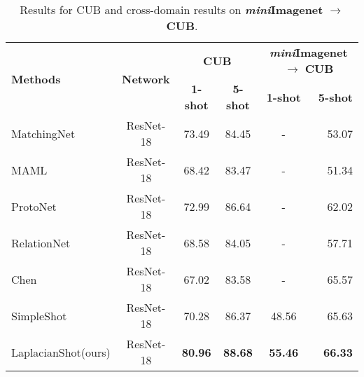 \documentclass{article}
\begin{document}
\begin{table*}[t]
\caption{Results for CUB and cross-domain results on \textbf{\textit{mini}Imagenet} $\rightarrow$ \textbf{CUB}.}
\label{tab:cub}
\vskip 0.1in
\begin{center}
\begin{small}
\begin{tabular}{lccccr}
\toprule
    \multirow{2}{*}{\textbf{Methods}}& \multirow{2}{*}{\textbf{Network}}& \multicolumn{2}{c}{\textbf{CUB}} & \multicolumn{2}{c}{\textbf{\textit{mini}Imagenet} $\rightarrow$ \textbf{CUB}}\\
     & & \textbf{1-shot}& \textbf{5-shot} & \textbf{1-shot}&\textbf{5-shot}\\
     \toprule
     MatchingNet \cite{Vinyals2016MatchingNF}& ResNet-18 &  73.49 & 84.45 & - & 53.07\\
     MAML \cite{Finn2017ModelAgnosticMF} & ResNet-18 & 68.42 & 83.47  & - & 51.34 \\
     ProtoNet \cite{snell2017prototypical} & ResNet-18 & 72.99 & 86.64  & - & 62.02 \\
     RelationNet \cite{sung2018learning} & ResNet-18 & 68.58 & 84.05  & - & 57.71 \\
     Chen \cite{chen2018a} & ResNet-18 & 67.02 & 83.58  & - & 65.57 \\
     SimpleShot \cite{wang2019simpleshot} & ResNet-18 & 70.28 & 86.37 & 48.56 &65.63\\
     \midrule
     LaplacianShot(ours) & ResNet-18 & \textbf{80.96} & \textbf{88.68} &\textbf{55.46} &\textbf{66.33}\\
     \bottomrule
\end{tabular}
\end{small}
\end{center}
\vskip -0.1in
\end{table*}
\end{document}
